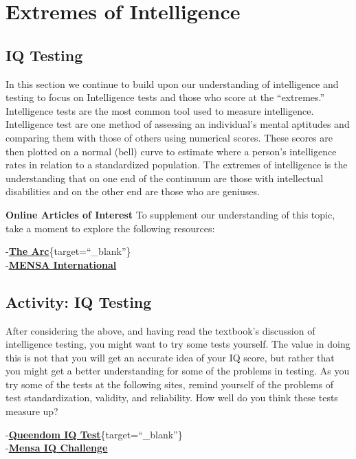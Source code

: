 \documentclass[
]{book}
\begin{document}
\hypertarget{extremes-of-intelligence}{%
\section{Extremes of Intelligence}\label{extremes-of-intelligence}}

\hypertarget{iq-testing}{%
\subsection*{IQ Testing}\label{iq-testing}}

In this section we continue to build upon our understanding of intelligence and testing to focus on Intelligence tests and those who score at the ``extremes.'' Intelligence tests are the most common tool used to measure intelligence. Intelligence test are one method of assessing an individual's mental aptitudes and comparing them with those of others using numerical scores. These scores are then plotted on a normal (bell) curve to estimate where a person's intelligence rates in relation to a standardized population. The extremes of intelligence is the understanding that on one end of the continuum are those with intellectual disabilities and on the other end are those who are geniuses.

\begin{caution}
\textbf{Online Articles of Interest}
To supplement our understanding of this topic, take a moment to explore the following resources:

-\href{https://thearc.org/}{\textbf{The Arc}}\{target=``\_blank''\}\\
-\href{https://www.mensa.org}{\textbf{MENSA International}}
\end{caution}

\hypertarget{activity-iq-testing}{%
\subsection*{Activity: IQ Testing}\label{activity-iq-testing}}

\begin{reflect}
After considering the above, and having read the textbook's discussion of intelligence testing, you might want to try some tests yourself. The value in doing this is not that you will get an accurate idea of your IQ score, but rather that you might get a better understanding for some of the problems in testing. As you try some of the tests at the following sites, remind yourself of the problems of test standardization, validity, and reliability. How well do you think these tests measure up?

-\href{https://www.queendom.com/tests/index.htm}{\textbf{Queendom IQ Test}}\{target=``\_blank''\}\\
-\href{https://www.mensa.org/public/mensa-iq-challenge}{\textbf{Mensa IQ Challenge}}\\
\end{reflect}
\end{document}
